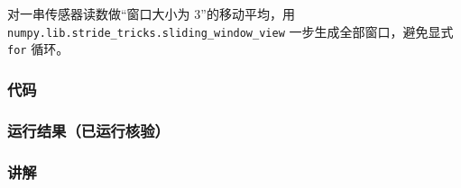 对一串传感器读数做``窗口大小为 3''的移动平均，用
\texttt{numpy.lib.stride\_tricks.sliding\_window\_view}
一步生成全部窗口，避免显式 \texttt{for} 循环。

\subsubsection{代码}\label{ux4ee3ux7801-3}

\begin{Shaded}
\begin{Highlighting}[]
\OperatorTok{=}\OperatorTok{=}\NormalTok{)}

\OperatorTok{=}\NormalTok{ np.array([}\NormalTok{, }\NormalTok{, }\NormalTok{, }\NormalTok{, }\NormalTok{, }\NormalTok{, }\NormalTok{])}

\OperatorTok{=}\NormalTok{)}
\NormalTok{(}\NormalTok{)}
\NormalTok{(}\OperatorTok{=}\NormalTok{))}
\end{Highlighting}
\end{Shaded}

\subsubsection{运行结果（已运行核验）}\label{ux8fd0ux884cux7ed3ux679cux5df2ux8fd0ux884cux6838ux9a8c-3}

\begin{Shaded}
\begin{Highlighting}[]
\NormalTok{[[1. 3. 2.]}
\NormalTok{ [3. 2. 5.]}
\NormalTok{ [2. 5. 4.]}
\NormalTok{ [5. 4. 6.]}
\NormalTok{ [4. 6. 2.]]}
\end{Highlighting}
\end{Shaded}

\subsubsection{讲解}\label{ux8bb2ux89e3-3}

